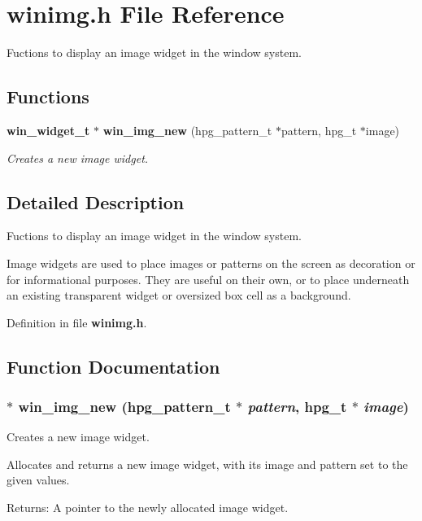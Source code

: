 \section{winimg.h File Reference}
\label{winimg_8h}
Fuctions to display an image widget in the window system. 

\subsection*{Functions}
\begin{CompactItemize}
\item 
{\bf win\_\-widget\_\-t} $\ast$ {\bf win\_\-img\_\-new} (hpg\_\-pattern\_\-t $\ast$pattern, hpg\_\-t $\ast$image)
\begin{CompactList}\small\item\em Creates a new image widget. \item\end{CompactList}\end{CompactItemize}


\subsection{Detailed Description}
Fuctions to display an image widget in the window system. 

Image widgets are used to place images or patterns on the screen as decoration or for informational purposes. They are useful on their own, or to place underneath an existing transparent widget or oversized box cell as a background. 

Definition in file {\bf winimg.h}.

\subsection{Function Documentation}
\subsubsection{$\ast$ win\_\-img\_\-new (hpg\_\-pattern\_\-t $\ast$ {\em pattern}, hpg\_\-t $\ast$ {\em image})}\label{winimg_8h_a0}


Creates a new image widget. 

Allocates and returns a new image widget, with its image and pattern set to the given values.

\begin{Desc}
\item[Returns:]A pointer to the newly allocated image widget. \end{Desc}

